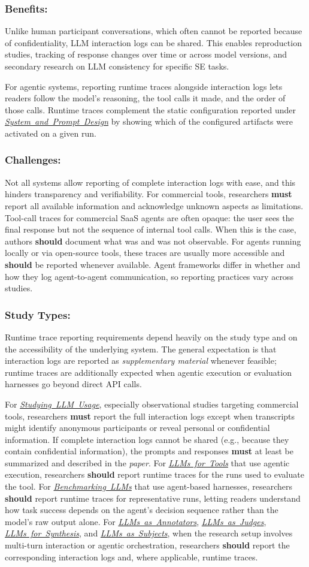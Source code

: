 \documentclass[smallextended]{svjour3}
\newcommand{\must}{\textbf{must}\xspace}
\newcommand{\should}{\textbf{should}\xspace}
\newcommand{\paper}{\emph{paper}\xspace}
\newcommand{\supplementarymaterial}{\emph{supplementary material}\xspace}
\newcommand{\paper}{\emph{paper}\xspace}
\newcommand{\supplementarymaterial}{\emph{supplementary material}\xspace}
\newcommand{\annotators}{\hyperref[sec:llms-as-annotators]{\mbox{\emph{LLMs as Annotators}}}\xspace}
\newcommand{\judges}{\hyperref[sec:llms-as-judges]{\mbox{\emph{LLMs as Judges}}}\xspace}
\newcommand{\synthesis}{\hyperref[sec:llms-for-synthesis]{\mbox{\emph{LLMs for Synthesis}}}\xspace}
\newcommand{\subjects}{\hyperref[sec:llms-as-subjects]{\mbox{\emph{LLMs as Subjects}}}\xspace}
\newcommand{\llmusage}{\hyperref[sec:studying-llm-usage-in-software-engineering]{\mbox{\emph{Studying LLM Usage}}}\xspace}
\newcommand{\newtools}{\hyperref[sec:llms-for-new-software-engineering-tools]{\mbox{\emph{LLMs for Tools}}}\xspace}
\newcommand{\benchmarkingtasks}{\hyperref[sec:benchmarking-llms-for-software-engineering-tasks]{\mbox{\emph{Benchmarking LLMs}}}\xspace}
\newcommand{\annotators}{\href{/study-types/annotators/}{\emph{LLMs as Annotators}}\xspace}
\newcommand{\judges}{\href{/study-types/judges/}{\emph{LLMs as Judges}}\xspace}
\newcommand{\synthesis}{\href{/study-types/synthesis/}{\emph{LLMs for Synthesis}}\xspace}
\newcommand{\subjects}{\href{/study-types/subjects/}{\emph{LLMs as Subjects}}\xspace}
\newcommand{\llmusage}{\href{/study-types/usage/}{\emph{Studying LLM Usage}}\xspace}
\newcommand{\newtools}{\href{/study-types/tools/}{\emph{LLMs for Tools}}\xspace}
\newcommand{\benchmarkingtasks}{\href{/study-types/benchmarking/}{\emph{Benchmarking LLMs}}\xspace}
\newcommand{\design}{\hyperref[sec:report-system-and-prompt-design]{\mbox{\emph{System and Prompt Design}}}\xspace}
\newcommand{\design}{\href{/guidelines/design/}{\emph{System and Prompt Design}}\xspace}
\newcommand{\guidelinesubsubsection}[1]{\subsubsection{\bfseries #1:}}
\newcommand{\guidelinesubsubsection}[1]{\subsubsection{#1}}
\begin{document}
\guidelinesubsubsection{Benefits}

Unlike human participant conversations, which often cannot be reported because of confidentiality, LLM interaction logs can be shared.
This enables reproduction studies, tracking of response changes over time or across model versions, and secondary research on LLM consistency for specific SE tasks.

For agentic systems, reporting runtime traces alongside interaction logs lets readers follow the model's reasoning, the tool calls it made, and the order of those calls.
Runtime traces complement the static configuration reported under \design by showing which of the configured artifacts were activated on a given run.

\guidelinesubsubsection{Challenges}

Not all systems allow reporting of complete interaction logs with ease, and this hinders transparency and verifiability.
For commercial tools, researchers \must report all available information and acknowledge unknown aspects as limitations.
Tool-call traces for commercial SaaS agents are often opaque: the user sees the final response but not the sequence of internal tool calls.
When this is the case, authors \should document what was and was not observable.
For agents running locally or via open-source tools, these traces are usually more accessible and \should be reported whenever available.
Agent frameworks differ in whether and how they log agent-to-agent communication, so reporting practices vary across studies.

\guidelinesubsubsection{Study Types}

Runtime trace reporting requirements depend heavily on the study type and on the accessibility of the underlying system.
The general expectation is that interaction logs are reported as \supplementarymaterial whenever feasible; runtime traces are additionally expected when agentic execution or evaluation harnesses go beyond direct API calls.

For \llmusage, especially observational studies targeting commercial tools, researchers \must report the full interaction logs except when transcripts might identify anonymous participants or reveal personal or confidential information.
If complete interaction logs cannot be shared (e.g., because they contain confidential information), the prompts and responses \must at least be summarized and described in the \paper.
For \newtools that use agentic execution, researchers \should report runtime traces for the runs used to evaluate the tool.
For \benchmarkingtasks that use agent-based harnesses, researchers \should report runtime traces for representative runs, letting readers understand how task success depends on the agent's decision sequence rather than the model's raw output alone.
For \annotators, \judges, \synthesis, and \subjects, when the research setup involves multi-turn interaction or agentic orchestration, researchers \should report the corresponding interaction logs and, where applicable, runtime traces.
\end{document}
